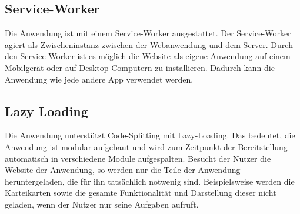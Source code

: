 \subsection{Service-Worker}
Die Anwendung ist mit einem Service-Worker ausgestattet.
Der Service-Worker agiert als Zwischeninstanz zwischen der Webanwendung und dem Server.
Durch den Service-Worker ist es möglich die Website als eigene Anwendung auf einem Mobilgerät oder auf Desktop-Computern zu installieren.
Dadurch kann die Anwendung wie jede andere App verwendet werden.



\subsection{Lazy Loading}
Die Anwendung unterstützt Code-Splitting mit Lazy-Loading.
Das bedeutet, die Anwendung ist modular aufgebaut und wird zum Zeitpunkt der Bereitstellung automatisch in verschiedene Module aufgespalten.
Besucht der Nutzer die Website der Anwendung, so werden nur die Teile der Anwendung heruntergeladen, die für ihn tatsächlich notwenig sind.
Beispielsweise werden die Karteikarten sowie die gesamte Funktionalität und Darstellung dieser nicht geladen, wenn der Nutzer nur seine Aufgaben aufruft.


